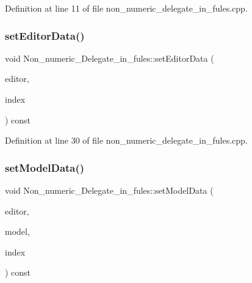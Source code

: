 Definition at line 11 of file non\+\_\+numeric\+\_\+delegate\+\_\+in\+\_\+fules.\+cpp.

\mbox{\label{classNon__numeric__Delegate__in__fules_a164816b371172eb34b15233572ca32d5}} 
\subsubsection{\texorpdfstring{set\+Editor\+Data()}{setEditorData()}}
{\footnotesize\ttfamily void Non\+\_\+numeric\+\_\+\+Delegate\+\_\+in\+\_\+fules\+::set\+Editor\+Data (\begin{DoxyParamCaption}\item[{Q\+Widget $\ast$}]{editor,  }\item[{const Q\+Model\+Index \&}]{index }\end{DoxyParamCaption}) const}



Definition at line 30 of file non\+\_\+numeric\+\_\+delegate\+\_\+in\+\_\+fules.\+cpp.

\mbox{\label{classNon__numeric__Delegate__in__fules_a31b9113d3edd7aa449f712b449ba0b08}} 
\subsubsection{\texorpdfstring{set\+Model\+Data()}{setModelData()}}
{\footnotesize\ttfamily void Non\+\_\+numeric\+\_\+\+Delegate\+\_\+in\+\_\+fules\+::set\+Model\+Data (\begin{DoxyParamCaption}\item[{Q\+Widget $\ast$}]{editor,  }\item[{Q\+Abstract\+Item\+Model $\ast$}]{model,  }\item[{const Q\+Model\+Index \&}]{index }\end{DoxyParamCaption}) const}



